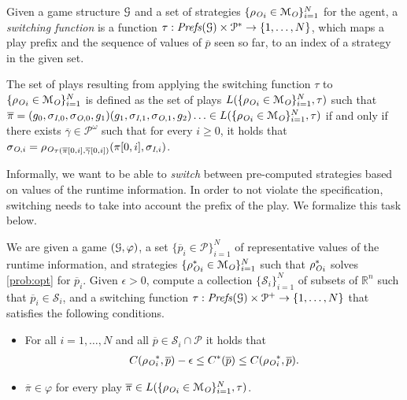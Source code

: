 \begin{defn}
Given a game structure $\mathcal{G}$ and a set of strategies $\{{\rho_{\textit{O}}}_i\in \mathcal{M}_{\textit{O}}\}_{i=1}^N$ for the agent, a \emph{switching function} is a function $\tau : \mathit{Prefs}(\mathcal{G}) \times \mathcal P^* \to \{1,\ldots,N\}$, which maps a play prefix and the sequence of values of $\overline p$ seen so far, to an index of a strategy in the given set.

The set of plays resulting from applying the switching function $\tau$ to $\{{\rho_{\textit{O}}}_i\in \mathcal{M}_{\textit{O}}\}_{i=1}^{N}$ is defined as the set of plays 
$L(\{{\rho_{\textit{O}}}_i\in\mathcal{M}_{\textit{O}}\}_{i=1}^{N},\tau)$ such that 
$\overline{\pi} = (g_0,\sigma_{\textit{I},0},\sigma_{\textit{O},0}, g_1) 
(g_1,\sigma_{\textit{I},1}, \sigma_{\textit{O},1}, g_2) \ldots \in L(\{{\rho_{\textit{O}}}_i\in \mathcal{M}_{\textit{O}}\}_{i=1}^{N},\tau)$
if and only if there exists $\overline \gamma \in \mathcal{P}^\omega$ such that
for every $i \geq 0$,  it holds that $\sigma_{\textit{O},i} ={\rho_{\textit{O}}}_{\tau(\overline \pi[0,i],\overline \gamma[0,i])}(\pi[0,i],\sigma_{\textit{I},i})$.
\end{defn}

Informally, we want to be able to \emph{switch} between pre-computed strategies based on values of the runtime information. In order to not violate the specification, switching needs to take into account the prefix of the play. We formalize this task below. 

   We are given a game $(\mathcal{G},\varphi)$, 
   a set $\{\overline{p}_i\in \mathcal{P}\}_{i=1}^{N}$ of representative values of the runtime information, and 
    strategies $\{{\rho_{\textit{O}}^\ast}_i\in \mathcal{M}_{\textit{O}}\}_{i=1}^{N}$ such that ${\rho_{\textit{O}}^\ast}_i$ solves \eqref{prob:opt} for $\overline{p}_i$. Given $\epsilon > 0$, compute a collection $\{\mathcal S_i\}_{i=1}^N$ of subsets of $\mathbb{R}^n$ such that $\overline{p}_i \in \mathcal{S}_i$, and a  switching function $\tau : \mathit{Prefs}(\mathcal{G}) \times \mathcal P^+ \to \{1,\ldots,N\}$ that satisfies the following conditions.
   \begin{itemize}
       \item For all $i =1,\ldots,N$ and all $\overline p \in \mathcal S_i \cap \mathcal P$ it holds that
    \begin{align}
  C({\rho_{\textit{O}}}_i^\ast,
    \overline{p}) - \epsilon \leq
        C^\ast(\overline{p}) \leq
        C({\rho_{\textit{O}}}_i^\ast,
    \overline{p}).
    \label{eq:bounds}
   \end{align}  
   \item $\overline\pi \in \varphi$ for every play $\overline \pi \in L(\{{\rho_{\textit{O}}}_i\in\mathcal{M}_{\textit{O}}\}_{i=1}^{N},\tau)$.
   \end{itemize}


